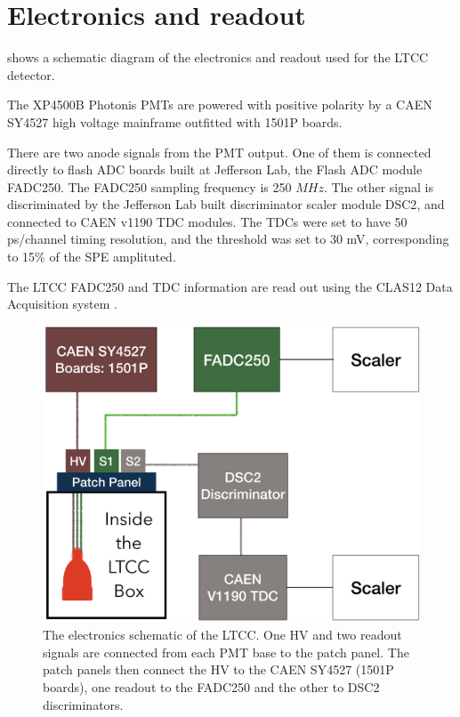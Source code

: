 \section{Electronics and readout}

 shows a schematic diagram of the electronics and readout used for the LTCC detector.

The XP4500B Photonis PMTs are powered with positive polarity by a CAEN SY4527 high voltage mainframe outfitted with 1501P boards.

There are two anode signals from the PMT output. One of them is connected directly to flash ADC
boards built at Jefferson Lab, the Flash ADC module FADC250\cite{daq-nim}. The FADC250 sampling frequency is 250 $MHz$.
The other signal is discriminated by the Jefferson Lab built discriminator scaler module DSC2\cite{daq-nim}, and connected to CAEN v1190 TDC modules.
The TDCs were set to have 50 ps/channel timing resolution, and the threshold was set to 30 mV, corresponding to 15\% of the SPE amplituted.

The LTCC FADC250 and TDC information are read out using the CLAS12 Data Acquisition system \cite{daq-nim}.

\begin{figure}
	\centering
	\includegraphics[width=0.99\columnwidth,keepaspectratio]{img/electronicScheme.png}
	\caption{The electronics schematic of the LTCC. One HV and two readout signals are connected from each PMT base to the patch panel.
		     The patch panels then connect the HV to the CAEN SY4527 (1501P boards), one readout to the FADC250
             and the other to DSC2 discriminators.}
	\label{fig:electronicScheme}
\end{figure}


